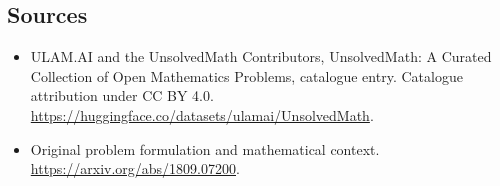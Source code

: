 \documentclass[11pt]{article}
\begin{document}
\subsection{Sources}
\begin{itemize}
\item[\hypertarget{source:statement:1}{S1}] ULAM.AI and the UnsolvedMath Contributors, UnsolvedMath: A Curated Collection of Open Mathematics Problems, catalogue entry. Catalogue attribution under CC BY 4.0.
\url{https://huggingface.co/datasets/ulamai/UnsolvedMath}.
\item[\hypertarget{source:statement:2}{S2}] Original problem formulation and mathematical context.
\url{https://arxiv.org/abs/1809.07200}.
\end{itemize}
\label{end:statement}
\end{document}
